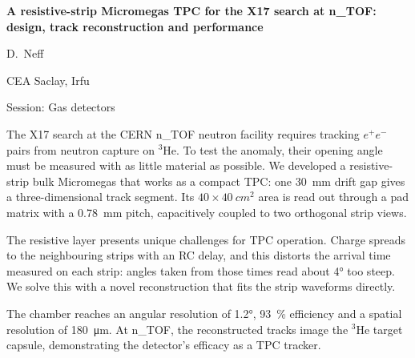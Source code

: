 \documentclass[11pt,a4paper]{article}
\begin{document}
\begin{center}
  {\Large\bfseries A resistive-strip Micromegas TPC for the X17 search at n\_TOF:\\[2pt]
  design, track reconstruction and performance\par}
  \vspace{10pt}
  {\large D.~Neff\par}
  {\small CEA Saclay, Irfu\par}
  \vspace{4pt}
  {\small Session: Gas detectors\par}
\end{center}

\vspace{6pt}

The X17 search at the CERN n\_TOF neutron facility requires tracking $e^+e^-$ pairs from neutron capture on
$^3$He. To test the anomaly, their opening angle must be measured with as little material as possible. We
developed a resistive-strip bulk Micromegas that works as a compact TPC: one \SI{30}{mm} drift gap gives a
three-dimensional track segment. Its $40\times\SI{40}{cm^2}$ area is read out through a pad matrix with a
\SI{0.78}{mm} pitch, capacitively coupled to two orthogonal strip views.

The resistive layer presents unique challenges for TPC operation. Charge spreads to the
neighbouring strips with an RC delay, and this distorts the arrival time measured on each strip: angles taken
from those times read about \ang{4} too steep. We solve this with a novel reconstruction that fits the strip waveforms directly.

The chamber reaches an angular resolution of \ang{1.2}, \SI{93}{\percent} efficiency and a spatial resolution
of \SI{180}{\micro m}. At n\_TOF, the reconstructed tracks image the $^3$He target capsule, demonstrating the
detector's efficacy as a TPC tracker.
\end{document}
